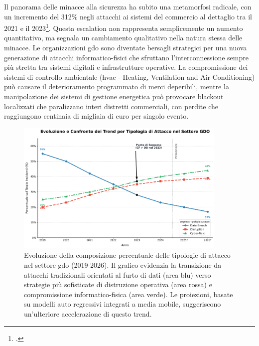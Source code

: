 Il panorama delle minacce alla sicurezza ha subito una metamorfosi radicale, con un incremento del 312\% negli attacchi ai sistemi del commercio al dettaglio tra il 2021 e il 2023\footcite{enisa2024retail}. Questa escalation non rappresenta semplicemente un aumento quantitativo, ma segnala un cambiamento qualitativo nella natura stessa delle minacce. Le organizzazioni \gls{gdo} sono diventate bersagli strategici per una nuova generazione di attacchi informatico-fisici che sfruttano l'interconnessione sempre più stretta tra sistemi digitali e infrastrutture operative. La compromissione dei sistemi di controllo ambientale (\gls{hvac} - Heating, Ventilation and Air Conditioning) può causare il deterioramento programmato di merci deperibili, mentre la manipolazione dei sistemi di gestione energetica può provocare blackout localizzati che paralizzano interi distretti commerciali, con perdite che raggiungono centinaia di migliaia di euro per singolo evento.

\begin{figure}[htbp]
\centering
\includegraphics[width=0.9\textwidth]{thesis_figures/cap1/evoluzione_attacchi.png}
\caption[Evoluzione della composizione percentuale delle tipologie di attacco nel settore GDO (2019-2026)]{Evoluzione della composizione percentuale delle tipologie di attacco nel settore \gls{gdo} (2019-2026). Il grafico evidenzia la transizione da attacchi tradizionali orientati al furto di dati (area blu) verso strategie più sofisticate di distruzione operativa (area rossa) e compromissione informatico-fisica (area verde). Le proiezioni, basate su modelli auto regressivi integrati a media mobile, suggeriscono un'ulteriore accelerazione di questo trend.}
\label{fig:evoluzione_attacchi}
\end{figure}


